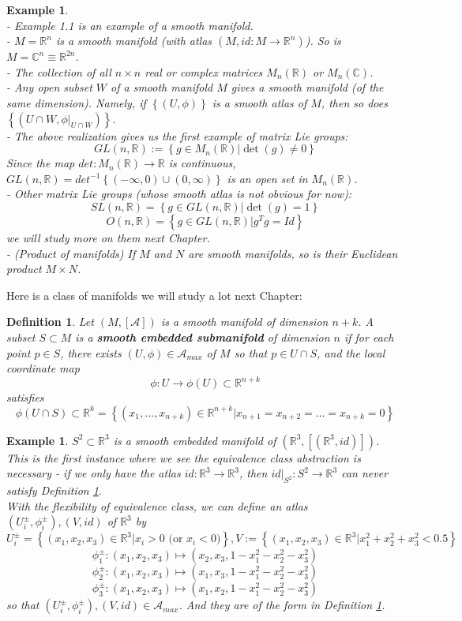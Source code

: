 \documentclass[11pt]{article}
\newtheorem{example}[theorem]{Example}
\newtheorem{definition}[theorem]{Definition}
\newcommand{\bb}[1]{\mathbb{#1}}
\newcommand{\mc}[1]{\mathcal{#1}}
\begin{document}
\begin{example}\mbox{}\\
- Example 1.1 is an example of a smooth manifold.\\
- $M = \bb{R}^n$ is a smooth manifold (with atlas $(M, id: M \to \bb{R}^n)$). So is $M = \bb{C}^n \equiv \bb{R}^{2n}$.\\
- The collection of all $n \times n$ real or complex matrices $M_{n}(\bb{R})$ or $M_{n}(\bb{C})$.\\
- Any open subset $W$ of a smooth manifold $M$ gives a smooth manifold (of the same dimension). Namely, if $\left\{(U,\phi)\right\}$ is a smooth atlas of $M$, then so does $\left\{(U \cap W, \phi|_{U \cap W})\right\}$.\\
- The above realization gives us the first example of matrix Lie groups:
$$GL(n,\bb{R}) := \left\{ g \in M_{n}(\bb{R}) | \det(g) \neq 0 \right\} $$
Since the map $det: M_n(\bb{R}) \to \bb{R}$ is continuous, $GL(n,\bb{R}) = det^{-1}\left\{(-\infty,0)\cup(0,\infty)\right\}$ is an open set in $M_n(\bb{R})$.\\
- Other matrix Lie groups (whose smooth atlas is not obvious for now):\\
$$SL(n,\bb{R}) = \left\{ g \in GL(n,\bb{R}) | \det(g) = 1 \right\}$$
$$O(n,\bb{R}) = \left\{ g \in GL(n,\bb{R}) | g^Tg = Id \right\}$$
we will study more on them next Chapter.\\
- (Product of manifolds) If $M$ and $N$ are smooth manifolds, so is their Euclidean product $M \times N$.
\end{example}
Here is a class of manifolds we will study a lot next Chapter:
\begin{definition}\label{sub}
Let $(M,[\mc{A}])$ is a smooth manifold of dimension $n+k$. A subset $S \subset M$ is a \textbf{smooth embedded submanifold} of dimension $n$ if for each point $p \in S$, there exists $(U, \phi) \in \mc{A}_{max}$ of $M$ so that $p \in U \cap S$, and the local coordinate map
$$\phi : U \to \phi(U) \subset \bb{R}^{n+k}$$
satisfies
$$\phi(U \cap S) \subset \bb{R}^k = \left\{ (x_1, \dots, x_{n+k}) \in \bb{R}^{n+k} | x_{n+1} = x_{n+2} = \dots = x_{n+k} = 0 \right\}$$
\end{definition}
\begin{example}
$S^2 \subset \bb{R}^3$ is a smooth embedded manifold of $(\bb{R}^3, [(\bb{R}^3, id)])$.\\
This is the first instance where we see the equivalence class abstraction is necessary - if we only have the atlas $id:\bb{R}^3 \to \bb{R}^3$, then $id|_{S^2} : S^2 \to \bb{R}^3$ can never satisfy Definition \ref{sub}.\\
With the flexibility of equivalence class, we can define an atlas $(U_i^{\pm}, \phi_i^{\pm}), (V, id)$ of $\bb{R}^3$ by
$$U_i^{\pm} = \left\{ (x_1, x_2, x_3) \in \bb{R}^3 | x_i > 0 \text{ (or } x_i< 0) \right\}, V := \left\{ (x_1, x_2, x_3) \in \bb{R}^3 | x_1^2 + x_2^2 + x_3^2 < 0.5 \right\}$$
$$\phi_1^{\pm}: (x_1, x_2, x_3) \mapsto (x_2, x_3, 1-x_1^2-x_2^2-x_3^2)$$
$$\phi_2^{\pm}: (x_1, x_2, x_3) \mapsto (x_1, x_3, 1-x_1^2-x_2^2-x_3^2)$$
$$\phi_3^{\pm}: (x_1, x_2, x_3) \mapsto (x_1, x_2, 1-x_1^2-x_2^2-x_3^2)$$
so that $(U_i^{\pm}, \phi_i^{\pm}), (V, id) \in \mc{A}_{max}$. And they are of the form in Definition \ref{sub}.
\end{example}
\end{document}

